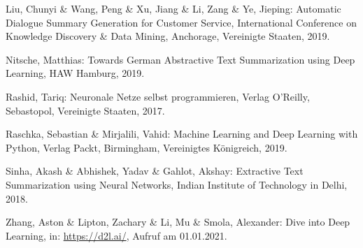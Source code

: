 \begin{thebibliography}{50}
Liu, Chunyi \& Wang, Peng \& Xu, Jiang \& Li, Zang \& Ye, Jieping: Automatic Dialogue Summary Generation for Customer Service, International Conference on Knowledge Discovery \& Data Mining, Anchorage, Vereinigte Staaten, 2019.

Nitsche, Matthias: Towards German Abstractive Text Summarization using Deep Learning, HAW Hamburg, 2019.

Rashid, Tariq: Neuronale Netze selbst programmieren, Verlag O'Reilly, Sebastopol, Vereinigte Staaten, 2017.

Raschka, Sebastian \& Mirjalili, Vahid: Machine Learning and Deep Learning with Python, Verlag Packt, Birmingham, Vereinigtes Königreich, 2019.

Sinha, Akash \& Abhishek, Yadav \& Gahlot, Akshay: Extractive Text Summarization using Neural Networks, Indian Institute of Technology in Delhi, 2018.

Zhang, Aston \& Lipton, Zachary \& Li, Mu \& Smola, Alexander: Dive into Deep Learning, in: \url{https://d2l.ai/}, Aufruf am 01.01.2021.

\end{thebibliography}
